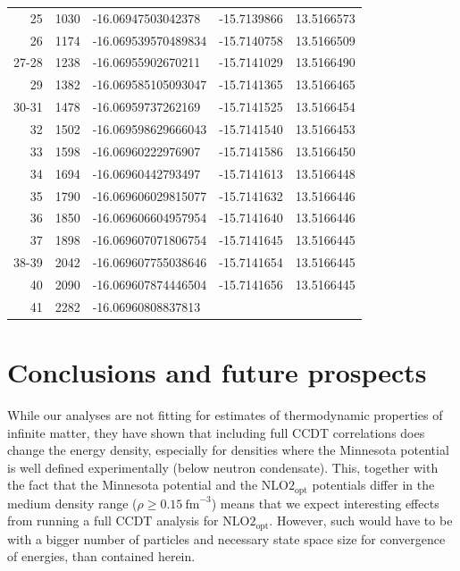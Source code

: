 \documentclass[10pt,twoside]{report}
\begin{document}
\begin{table}[h]
\begin{tabular}{rrlll}
			25 & 1030 & -16.06947503042378 & -15.7139866 & 13.5166573\\ 
			26 & 1174 & -16.069539570489834 & -15.7140758 & 13.5166509\\ 
			27-28 & 1238 & -16.06955902670211 & -15.7141029 & 13.5166490\\ 
			29 & 1382 & -16.069585105093047 & -15.7141365 & 13.5166465\\ 
			30-31 & 1478 & -16.06959737262169 & -15.7141525 & 13.5166454\\ 
			32 & 1502 & -16.069598629666043 & -15.7141540 & 13.5166453\\ 
			33 & 1598 & -16.06960222976907 & -15.7141586 & 13.5166450\\ 
			34 & 1694 & -16.06960442793497 & -15.7141613 & 13.5166448\\ 
			35 & 1790 & -16.069606029815077 & -15.7141632 & 13.5166446\\ 
			36 & 1850 & -16.069606604957954 & -15.7141640 & 13.5166446\\ 
			37 & 1898 & -16.069607071806754 & -15.7141645 & 13.5166445\\ 
			38-39 & 2042 & -16.069607755038646 & -15.7141654 & 13.5166445\\ 
			40 & 2090 & -16.069607874446504 & -15.7141656 & 13.5166445\\
			41 & 2282 & -16.06960808837813 &&
		\end{tabular}
		\label{Appendix B | table | CCD for MP}
	\end{table}
	
	\chapter{Conclusions and future prospects}
	
	While our analyses are not fitting for estimates of thermodynamic properties of infinite matter, they have shown that including full CCDT correlations does change the energy density, especially for densities where the Minnesota potential is well defined experimentally (below neutron condensate). This, together with the fact that the Minnesota potential and the $\text{NLO2}_{\text{opt}}$ \cite{HJensenEtAl13} potentials differ in the medium density range ($\rho\geq 0.15\:\text{fm}^{-3}$) \cite{GHagen14} means that we expect interesting effects from running a full CCDT analysis for $\text{NLO2}_{\text{opt}}$. However, such would have to be with a bigger number of particles and necessary state space size for convergence of energies, than contained herein.\\
	
\end{document}
